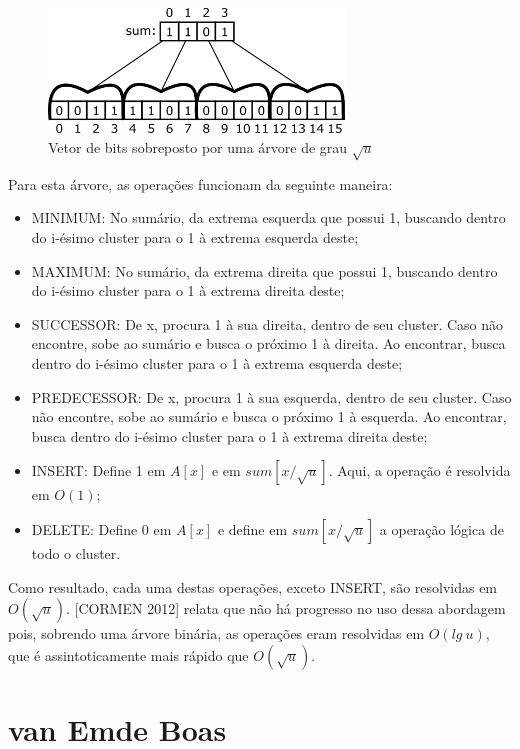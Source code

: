\documentclass[12pt]{article}
\begin{document}
\begin{figure}[ht]
\centering
\includegraphics[width=0.7\textwidth]{arvoreAlturaConstante.png}
\caption{Vetor de bits sobreposto por uma árvore de grau $\sqrt{u}$}
\label{fig:arvoreAlturaConstante}
\end{figure}

Para esta árvore, as operações funcionam da seguinte maneira:
\begin{itemize}
    \item MINIMUM: No sumário, da extrema esquerda que possui 1, buscando dentro do i-ésimo cluster para o 1 à extrema esquerda deste;
    \item MAXIMUM: No sumário, da extrema direita que possui 1, buscando dentro do i-ésimo cluster para o 1 à extrema direita deste;
    \item SUCCESSOR: De x, procura 1 à sua direita, dentro de seu cluster. Caso não encontre, sobe ao sumário e busca o próximo 1 à direita. Ao encontrar, busca dentro do i-ésimo cluster para o 1 à extrema esquerda deste;
    \item PREDECESSOR: De x, procura 1 à sua esquerda, dentro de seu cluster. Caso não encontre, sobe ao sumário e busca o próximo 1 à esquerda. Ao encontrar, busca dentro do i-ésimo cluster para o 1 à extrema direita deste;
    \item INSERT: Define 1 em $A[x]$ e em $sum[x/\sqrt{u}]$. Aqui, a operação é resolvida em $O(1)$;
    \item DELETE: Define 0 em $A[x]$ e define em $sum[x/\sqrt{u}]$ a operação lógica de todo o cluster.
\end{itemize}

Como resultado, cada uma destas operações, exceto INSERT, são resolvidas em $O(\sqrt{u})$. [CORMEN 2012] relata que não há progresso no uso dessa abordagem pois, sobrendo uma árvore binária, as operações eram resolvidas em $O(lg\ u)$, que é assintoticamente mais rápido que $O(\sqrt{u})$.

\section{van Emde Boas} \label{sec:vanEmdeBoas}
\end{document}
